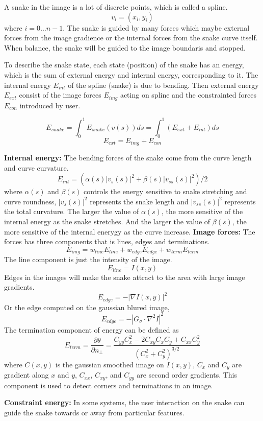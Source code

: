 A snake in the image is a lot of discrete points, which is called a spline.
$$
v_i = (x_i, y_i)
$$
where $i=0\ldots n-1$. The snake is guided by many forces which maybe external forces from the image gradience or the internal forces from the snake curve itself. When balance, the snake will be guided to the image boundaris and stopped.

To describe the snake state, each state (position) of the snake has an energy, which is the sum of external energy and internal energy, corresponding to it. The internal energy $E_{int}$ of the spline (snake) is due to bending. Then external energy $E_{ext}$ consist of the image forces $E_{img}$ acting on spline and the constrainted forces $E_{con}$ introduced by user. 

$$
E_{snake} = \int_0^1E_{snake}(v(s))ds = \int_0^1(E_{ext} + E_{int})ds
$$
$$
E_{ext} = E_{img} + E_{con}
$$

\textbf{Internal energy: } The bending forces of the snake come from the curve length and curve curvature.
\begin{equation}\label{eqn:int-energy}
E_{int} = (\alpha(s)|v_s(s)|^2 + \beta(s)|v_{ss}(s)|^2)/2
\end{equation}
where $\alpha(s)$ and $\beta(s)$ controls the energy sensitive to snake stretching and curve roundness, $|v_s(s)|^2$ represents the snake length and $|v_{ss}(s)|^2$ represents the total curvature. The larger the value of $\alpha(s)$, the more sensitive of the internal energy as the snake stretches. And the larger the value of $\beta(s)$, the more sensitive of the internal enerygy as the curve increase.
\textbf{Image forces: } The forces has three components that is lines, edges and terminations.
$$
E_{img} = w_{line}E_{line} + w_{edge}E_{edge} + w_{term}E_{term}
$$
The line component is just the intensity of the image.
$$
E_{line} = I(x,y)
$$
Edges in the images will make the snake attract to the area with large image gradients.
$$
E_{edge} = -|\nabla I(x,y)|^2
$$
Or the edge computed on the gaussian blured image,
$$
E_{edge} = -|G_\sigma \cdot \nabla^2 I|^2
$$
The termination component of energy can be defined as
$$
E_{term} = \frac{\partial \theta}{\partial n_\perp} = \frac{C_{yy}C_x^2 - 2C_{xy}C_xC_y + C_{xx}C_y^2}{(C_x^2 + C_y^2)^{3/2}}
$$
where $C(x,y)$ is the gaussian smoothed image on $I(x,y)$, $C_x$ and $C_y$ are gradient along $x$ and $y$, $C_{xx}$, $C_{xy}$, and $C_{yy}$ are second order gradients. This component is used to detect corners and terminations in an image.

\textbf{Constraint energy: } In some systems, the user interaction on the snake can guide the snake towards or away from particular features. 
